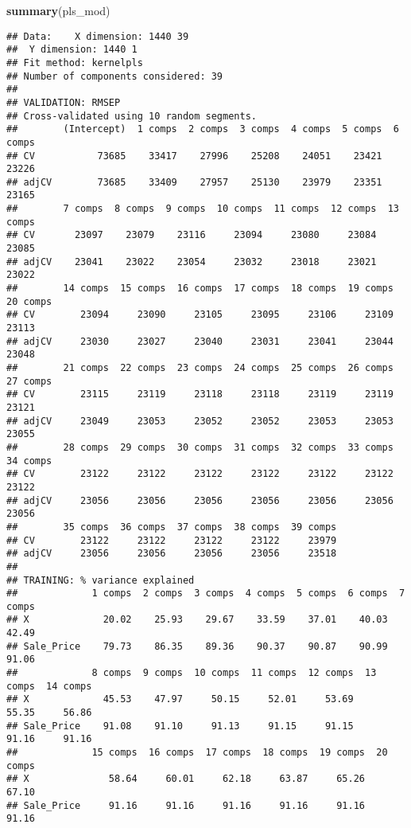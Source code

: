 \documentclass[
]{article}
\newenvironment{Shaded}{\begin{snugshade}}{\end{snugshade}}
\newcommand{\FunctionTok}[1]{\textcolor[rgb]{0.13,0.29,0.53}{\textbf{#1}}}
\newcommand{\NormalTok}[1]{#1}
\begin{document}
\begin{Shaded}
\begin{Highlighting}[]
\FunctionTok{summary}\NormalTok{(pls\_mod)}
\end{Highlighting}
\end{Shaded}

\begin{verbatim}
## Data:    X dimension: 1440 39 
##  Y dimension: 1440 1
## Fit method: kernelpls
## Number of components considered: 39
## 
## VALIDATION: RMSEP
## Cross-validated using 10 random segments.
##        (Intercept)  1 comps  2 comps  3 comps  4 comps  5 comps  6 comps
## CV           73685    33417    27996    25208    24051    23421    23226
## adjCV        73685    33409    27957    25130    23979    23351    23165
##        7 comps  8 comps  9 comps  10 comps  11 comps  12 comps  13 comps
## CV       23097    23079    23116     23094     23080     23084     23085
## adjCV    23041    23022    23054     23032     23018     23021     23022
##        14 comps  15 comps  16 comps  17 comps  18 comps  19 comps  20 comps
## CV        23094     23090     23105     23095     23106     23109     23113
## adjCV     23030     23027     23040     23031     23041     23044     23048
##        21 comps  22 comps  23 comps  24 comps  25 comps  26 comps  27 comps
## CV        23115     23119     23118     23118     23119     23119     23121
## adjCV     23049     23053     23052     23052     23053     23053     23055
##        28 comps  29 comps  30 comps  31 comps  32 comps  33 comps  34 comps
## CV        23122     23122     23122     23122     23122     23122     23122
## adjCV     23056     23056     23056     23056     23056     23056     23056
##        35 comps  36 comps  37 comps  38 comps  39 comps
## CV        23122     23122     23122     23122     23979
## adjCV     23056     23056     23056     23056     23518
## 
## TRAINING: % variance explained
##             1 comps  2 comps  3 comps  4 comps  5 comps  6 comps  7 comps
## X             20.02    25.93    29.67    33.59    37.01    40.03    42.49
## Sale_Price    79.73    86.35    89.36    90.37    90.87    90.99    91.06
##             8 comps  9 comps  10 comps  11 comps  12 comps  13 comps  14 comps
## X             45.53    47.97     50.15     52.01     53.69     55.35     56.86
## Sale_Price    91.08    91.10     91.13     91.15     91.15     91.16     91.16
##             15 comps  16 comps  17 comps  18 comps  19 comps  20 comps
## X              58.64     60.01     62.18     63.87     65.26     67.10
## Sale_Price     91.16     91.16     91.16     91.16     91.16     91.16

\end{verbatim}
\end{document}
